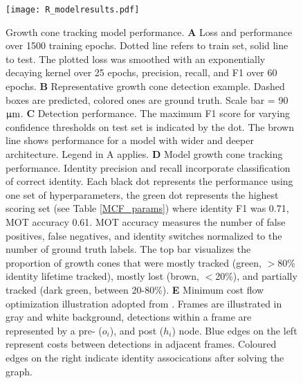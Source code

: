 \begin{figure}[h!tp]
    \texttt{[image: R\_modelresults.pdf]}
    \caption[Growth cone tracking model performance]
        {Growth cone tracking model performance. \textbf{A} Loss and performance
        over 1500 training epochs. Dotted line refers to train set, solid line
        to test. The plotted loss was smoothed with an exponentially decaying
        kernel over 25 epochs, precision, recall, and F1 over 60 epochs.
        \textbf{B} Representative growth cone detection example. Dashed boxes
        are predicted, colored ones are ground truth. Scale bar = 90 $\rm \upmu
        m$. \textbf{C} Detection performance. The maximum F1 score for varying
        confidence thresholds on test set is indicated by the dot. The brown
        line shows performance for a model with wider and deeper architecture.
        Legend in A applies. \textbf{D} Model growth cone tracking performance.
        Identity precision and recall incorporate classification of correct
        identity. Each black dot represents the performance using one set of
        hyperparameters, the green dot represents the highest scoring set (see
        Table \ref{MCF_params}) where identity F1 was 0.71, MOT accuracy 0.61.
        MOT accuracy measures the number of false positives, false negatives,
        and identity switches normalized to the number of ground truth labels.
        The top bar visualizes the proportion of growth cones that were mostly
        tracked (green, $>$80\% identity lifetime tracked), mostly lost (brown,
        $<$20\%), and partially tracked (dark green, between 20-80\%).
        \textbf{E} Minimum cost flow optimization illustration adopted from
        \parencite{MCF}. Frames are illustrated in gray and white background,
        detections within a frame are represented by a pre- ($o_i$), and post
        ($h_i$) node. Blue edges on the left represent costs between detections
        in adjacent frames. Coloured edges on the right indicate identity
        assocications after solving the graph. } 
    \label{R_modelresults}
\end{figure}


